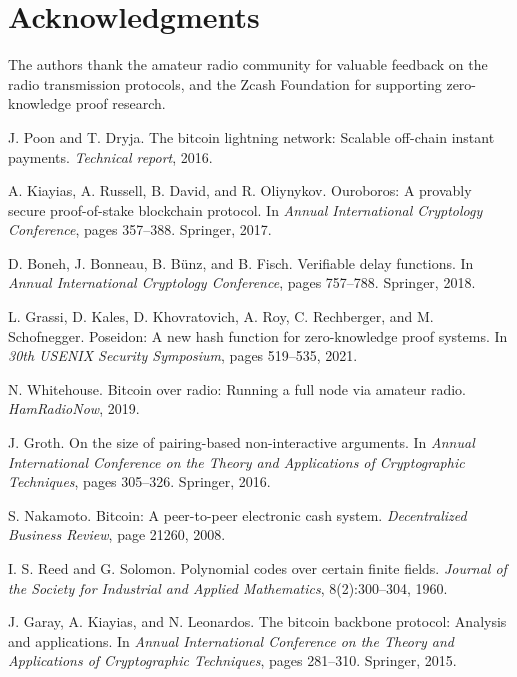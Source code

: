 \documentclass[11pt,a4paper]{article}
\begin{document}
\section*{Acknowledgments}

The authors thank the amateur radio community for valuable feedback on the radio transmission protocols, and the Zcash Foundation for supporting zero-knowledge proof research.

\begin{thebibliography}{99}

J. Poon and T. Dryja.
\newblock The bitcoin lightning network: Scalable off-chain instant payments.
\newblock \emph{Technical report}, 2016.

A. Kiayias, A. Russell, B. David, and R. Oliynykov.
\newblock Ouroboros: A provably secure proof-of-stake blockchain protocol.
\newblock In \emph{Annual International Cryptology Conference}, pages 357--388. Springer, 2017.

D. Boneh, J. Bonneau, B. Bünz, and B. Fisch.
\newblock Verifiable delay functions.
\newblock In \emph{Annual International Cryptology Conference}, pages 757--788. Springer, 2018.

L. Grassi, D. Kales, D. Khovratovich, A. Roy, C. Rechberger, and M. Schofnegger.
\newblock Poseidon: A new hash function for zero-knowledge proof systems.
\newblock In \emph{30th USENIX Security Symposium}, pages 519--535, 2021.

N. Whitehouse.
\newblock Bitcoin over radio: Running a full node via amateur radio.
\newblock \emph{HamRadioNow}, 2019.

J. Groth.
\newblock On the size of pairing-based non-interactive arguments.
\newblock In \emph{Annual International Conference on the Theory and Applications of Cryptographic Techniques}, pages 305--326. Springer, 2016.

S. Nakamoto.
\newblock Bitcoin: A peer-to-peer electronic cash system.
\newblock \emph{Decentralized Business Review}, page 21260, 2008.

I. S. Reed and G. Solomon.
\newblock Polynomial codes over certain finite fields.
\newblock \emph{Journal of the Society for Industrial and Applied Mathematics}, 8(2):300--304, 1960.

J. Garay, A. Kiayias, and N. Leonardos.
\newblock The bitcoin backbone protocol: Analysis and applications.
\newblock In \emph{Annual International Conference on the Theory and Applications of Cryptographic Techniques}, pages 281--310. Springer, 2015.


\end{thebibliography}
\end{document}
